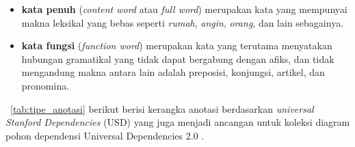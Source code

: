 \begin{itemize}
	\item \textbf{kata penuh} (\textit{content word} atau \textit{full word}) merupakan kata yang mempunyai makna leksikal yang bebas seperti \textit{rumah}, \textit{angin}, \textit{orang}, dan lain sebagainya.
	\item \textbf{kata fungsi} (\textit{function word}) merupakan kata yang terutama menyatakan hubungan gramatikal yang tidak dapat bergabung dengan afiks, dan tidak mengandung makna antara lain adalah preposisi, konjungsi, artikel, dan pronomina.
\end{itemize}

\tab~\ref{tab:tipe_anotasi} berikut berisi kerangka anotasi berdasarkan \textit{universal Stanford Dependencies} (USD) \citep{de2014universal} yang juga menjadi ancangan untuk koleksi diagram pohon dependensi Universal Dependencies 2.0 \citep{nivre2017universal}.

